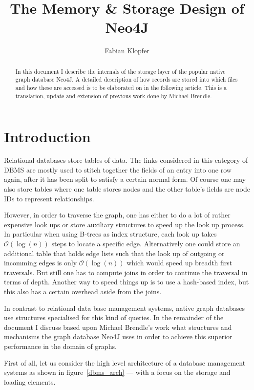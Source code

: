 \documentclass[a4paper,10pt]{article}
\title{The Memory \& Storage Design of Neo4J}
\author{Fabian Klopfer}
\begin{document}
\maketitle

\begin{abstract}
In this document I describe the internals of the storage layer of the popular native graph database Neo4J. A detailed description of how records are stored into which files and how these are accessed is to be elaborated on in the following article. This is a translation, update and extension of previous work done by Michael Brendle. 
\end{abstract}



\section{Introduction}
Relational databases store tables of data. The links considered in this category of DBMS are mostly used to stitch together the fields of an entry into one row again, after it has been split to satisfy a certain normal form. Of course one may also store tables where one table stores nodes and the other table's fields are node IDs to represent relationships.

However, in order to traverse the graph, one has either to do a lot of rather expensive look ups or store auxiliary structures to speed up the look up process. In particular when using B-trees as index structure, each look up takes $\mathcal{O}(\log(n))$ steps to locate a specific edge. Alternatively one could store an additional table that holds edge lists such that the look up of outgoing or incomming edges is only $\mathcal{O}(\log(n))$ which would speed up breadth first traversals. But still one has to compute joins in order to continue the traversal in terms of depth. Another way to speed things up is to use a hash-based index, but this also has a certain overhead aside from the joins.

In contrast to relational data base management systems, native graph databases use structures specialised for this kind of queries. In the remainder of the document I discuss based upon Michael Brendle's work what structures and mechanisms the graph database Neo4J uses in order to achieve this superior performance in the domain of graphs.

First of all, let us consider the high level architecture of a database management systems as shown in figure~\ref{dbms_arch} --- with a focus on the storage and loading elements.
\end{document}
